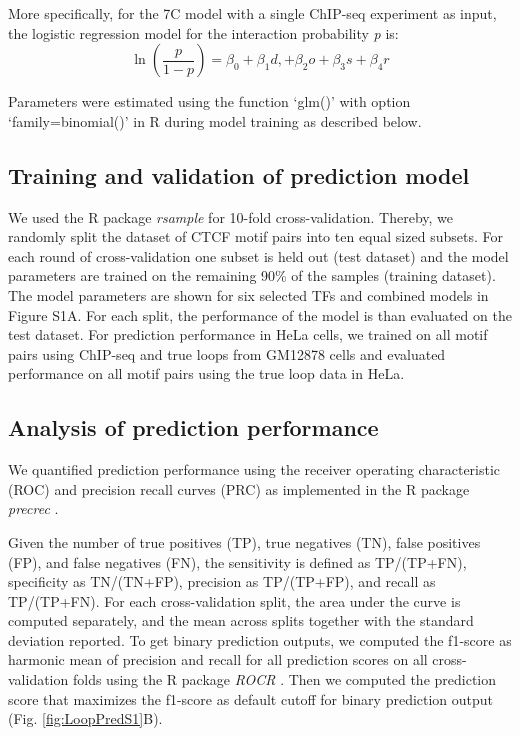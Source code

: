 \documentclass[a4paper,twoside=true,openright,parskip=full,chapterprefix=true,11pt,headings=normal,bibliography=totoc,listof=totoc,titlepage=on,captions=tableabove,draft=false]{scrreprt}
\theoremstyle{definition}
\theoremstyle{definition}
\theoremstyle{definition}
\theoremstyle{remark}
\begin{document}
More specifically, for the 7C model with a single ChIP-seq experiment as
input, the logistic regression model for the interaction probability
\emph{p} is: \[
\ln (\frac{p}{1-p}) = \beta_0 + \beta_1 d, + \beta_2 o + \beta_3 s + \beta_4 r
\]

Parameters were estimated using the function `glm()' with option
`family=binomial()' in R during model training as described below.

\hypertarget{training-and-validation-of-prediction-model}{%
\subsection{Training and validation of prediction
model}\label{training-and-validation-of-prediction-model}}

We used the R package \emph{rsample} for 10-fold cross-validation.
Thereby, we randomly split the dataset of CTCF motif pairs into ten
equal sized subsets. For each round of cross-validation one subset is
held out (test dataset) and the model parameters are trained on the
remaining 90\% of the samples (training dataset). The model parameters
are shown for six selected TFs and combined models in Figure S1A. For
each split, the performance of the model is than evaluated on the test
dataset. For prediction performance in HeLa cells, we trained on all
motif pairs using ChIP-seq and true loops from GM12878 cells and
evaluated performance on all motif pairs using the true loop data in
HeLa.

\hypertarget{analysis-of-prediction-performance}{%
\subsection{Analysis of prediction
performance}\label{analysis-of-prediction-performance}}

We quantified prediction performance using the receiver operating
characteristic (ROC) and precision recall curves (PRC) as implemented in
the R package \emph{precrec} \citep{Saito2017}.

Given the number of true positives (TP), true negatives (TN), false
positives (FP), and false negatives (FN), the sensitivity is defined as
TP/(TP+FN), specificity as TN/(TN+FP), precision as TP/(TP+FP), and
recall as TP/(TP+FN). For each cross-validation split, the area under
the curve is computed separately, and the mean across splits together
with the standard deviation reported. To get binary prediction outputs,
we computed the f1-score as harmonic mean of precision and recall for
all prediction scores on all cross-validation folds using the R package
\emph{ROCR} \citep{Sing2005}. Then we computed the prediction score that
maximizes the f1-score as default cutoff for binary prediction output
(Fig. \ref{fig:LoopPredS1}B).
\end{document}
